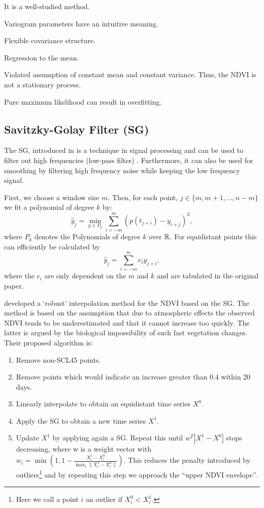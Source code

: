 		\begin{my_pros_cons_table}{
				\item It is a well-studied method.
				\item Variogram parameters have an intuitive meaning.
				\item Flexible covariance structure.
			}{
				\item Regression to the mean.
				\item Violated assumption of constant mean and constant variance. Thus, the NDVI is not a stationary process.
				\item Pure maximum likelihood can result in overfitting.
			}
		\end{my_pros_cons_table}


	\subsection{Savitzky-Golay Filter (SG)}
		\label{sec:Savitzky-Golay}
		The SG, introduced in \cite{savitzkySmoothingDifferentiationData1964} is a technique in signal processing and can be used to filter out high frequencies (low-pass filter) \citep{schaferWhatSavitzkyGolayFilter2011}. Furthermore, it can also be used for smoothing by filtering high frequency noise while keeping the low frequency signal.

		First, we choose a window size $m$. Then, for each point, $j \in \{m, m+1, \dots, n-m\}$ we fit a polynomial of degree $k$ by:
		$$\hat y_j=\min_{p\in P_k}\sum_{i=-m}^{m}(p (t_{j+i})-y_{i+j})^{2},$$
		where $P_k$ denotes the Polynomials of degree $k$ over $\mathbb{R}$.
		For equidistant points this can efficiently be calculated by
		$$
			\hat y_{j}=\sum_{i=-m}^{m} c_{i} y_{j+i},
		$$
		where the $c_i$ are only dependent on the $m$ and $k$ and are tabulated in the original paper.

		\cite{chenSimpleMethodReconstructing2004a} developed a `robust' interpolation method for the NDVI based on the SG. 
		The method is based on the assumption that due to atmospheric effects the observed NDVI tends to be underestimated and that it cannot increase too quickly. The latter is argued by the biological impossibility of such fast vegetation changes. Their proposed algorithm is:
			\begin{enumerate}
				\item Remove non-SCL45 points.
				\item Remove points which would indicate an increase greater than 0.4 within 20 days.
				\item Linearly interpolate to obtain an equidistant time series $X^0$.
				\item Apply the SG to obtain a new time series $X^1$.
				\item Update $X^1$ by applying again a SG. Repeat this until $w^T |X^1-X^0|$ stops decreasing, where w is a weight vector with $w_i = \min\left(1, 1 - \frac{X^1_i-X^0_i}{\max_i\|X^1_i-X^0_i\|}\right)$. This reduces the penalty introduced by outliers\footnote{Here we call a point $i$ an outlier if $X^0_i<X^1_i$.} and by repeating this step we approach the ``upper NDVI envelope''.
			\end{enumerate}

